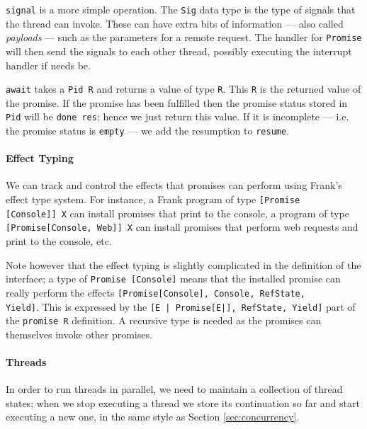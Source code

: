 \documentclass[msc,deptreport,cs]{infthesis} %
\newcommand{\code}[1]{\lstinline{#1}}
\newcommand{\todo}[1]
           {{\par\noindent\small\color{RoyalPurple}
  \framebox{\parbox{\dimexpr\linewidth-2\fboxsep-2\fboxrule}
    {\textbf{TODO:} #1}}}}
\begin{document}
\code{signal} is a more simple operation. The \code{Sig} data type is the type
of signals that the thread can invoke. These can have extra bits of information
--- also called \emph{payloads} --- such as the parameters for a remote request.
The handler for \code{Promise} will then send the signals to each other thread,
possibly executing the interrupt handler if needs be.

\code{await} takes a \code{Pid R} and returns a value of type \code{R}. This
\code{R} is the returned value of the promise. If the promise has been fulfilled
then the promise status stored in \code{Pid} will be \code{done res}; hence we
just return this value. If it is incomplete --- i.e. the promise status is
\code{empty} --- we add the resumption to \code{resume}.

\paragraph*{Effect Typing}

We can track and control the effects that promises can perform using Frank's
effect type system. For instance, a Frank program of type \code{[Promise
    [Console]] X} can install promises that print to the console, a program of
type \code{[Promise[Console, Web]] X} can install promises that perform web
requests and print to the console, etc.

Note however that the effect typing is slightly complicated in the definition of the
interface; a type of \code{Promise [Console]} means that the installed promise
can really perform the effects \code{[Promise[Console], Console, RefState,
    Yield]}. This is expressed by the \code{[E | Promise[E|], RefState, Yield]}
part of the \code{promise R} definition. A recursive type is needed as the
promises can themselves invoke other promises.

\todo{Flesh this out, rewrite it}

\paragraph*{Threads}


In order to run threads in parallel, we need to maintain a collection of
thread states; when we stop executing a thread we store its continuation so far
and start executing a new one, in the same style as Section
\ref{sec:concurrency}.
\end{document}

